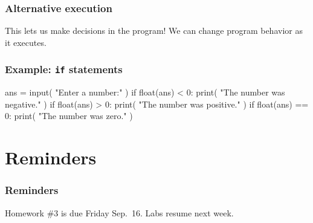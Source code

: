 \documentclass[11pt]{beamer}
\begin{document}
\begin{frame}[fragile]
  \frametitle{Alternative execution}
  \Enlarge

  \begin{itemize}
  \myitem  This lets us make decisions in the program!
  \myitem  We can change program behavior as it executes.
  \end{itemize}
\end{frame}

\begin{frame}[fragile]
  \frametitle{Example:  \texttt{if} statements}
  \Enlarge

  \begin{semiverbatim}
ans = input( "Enter a number:" )
if float(ans) < 0:
    print( "The number was negative." )
if float(ans) > 0:
    print( "The number was positive." )
if float(ans) == 0:
    print( "The number was zero." )
  \end{semiverbatim}
\end{frame}

\section{Reminders}

\begin{frame}
  \frametitle{Reminders}
  \Enlarge

  \begin{itemize}
  \myitem  Homework \#3 is due Friday Sep.\ 16.
  \myitem  Labs resume next week.
  \end{itemize}
\end{frame}
\end{document}
